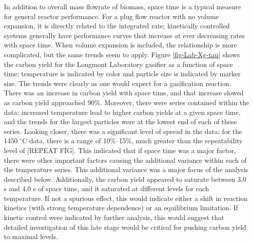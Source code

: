\documentclass[11pt,twocolumn]{article}
\begin{document}
In addition to overall mass flowrate of biomass, space time is a typical measure for general reactor performance.  For a plug flow reactor with no volume expansion, it is directly related to the integrated rate; kinetically controlled systems generally have performance curves that increase at ever decreasing rates with space time.  When volume expansion is included, the relationship is more complicated, but the same trends seem to apply.  Figure \ref{fig-Lab-Xg-tau} shows the carbon yield for the Longmont Laboratory gasifier as a function of space time; temperature is indicated by color and particle size is indicated by marker size.  The trends were clearly as one would expect for a gasification reaction.  There was an increase in carbon yield with space time, and that increase slowed as carbon yield approached 90\%.  Moreover, there were series contained within the data: increased temperature lead to higher carbon yields at a given space time, and the trends for the largest particles were at the lowest end of each of these series.  Looking closer, there was a significant level of spread in the data: for the 1450 $^{\circ}$C data, there is a range of 10\%--15\%, much greater than the repeatability level of [REPEAT FIG].  This indicated that if space time was a major factor, there were other important factors causing the additional variance within each of the temperature series.  This additional variance was a major focus of the analysis described below.  Additionally, the carbon yield appeared to saturate between 3.0 s and 4.0 s of space time, and it saturated at different levels for each temperature.  If not a spurious effect, this would indicate either a shift in reaction kinetics (with strong temperature dependence) or an equilibrium limitation.  If kinetic control were indicated by further analysis, this would suggest that detailed investigation of this late stage would be critical for pushing carbon yield to maximal levels. 
\end{document}
